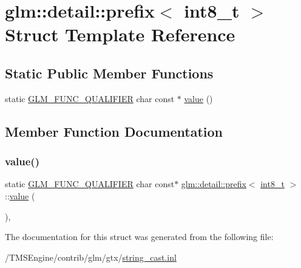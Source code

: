 \hypertarget{structglm_1_1detail_1_1prefix_3_01int8__t_01_4}{}\section{glm\+:\+:detail\+:\+:prefix$<$ int8\+\_\+t $>$ Struct Template Reference}
\label{structglm_1_1detail_1_1prefix_3_01int8__t_01_4}
\subsection*{Static Public Member Functions}
\begin{DoxyCompactItemize}
\item 
static \hyperlink{setup_8hpp_a33fdea6f91c5f834105f7415e2a64407}{G\+L\+M\+\_\+\+F\+U\+N\+C\+\_\+\+Q\+U\+A\+L\+I\+F\+I\+ER} char const  $\ast$ \hyperlink{structglm_1_1detail_1_1prefix_3_01int8__t_01_4_afb4b2223c44e4e8f75bde375b0f874a2}{value} ()
\end{DoxyCompactItemize}


\subsection{Member Function Documentation}
\mbox{\label{structglm_1_1detail_1_1prefix_3_01int8__t_01_4_afb4b2223c44e4e8f75bde375b0f874a2}} 
\subsubsection{\texorpdfstring{value()}{value()}}
{\footnotesize\ttfamily static \hyperlink{setup_8hpp_a33fdea6f91c5f834105f7415e2a64407}{G\+L\+M\+\_\+\+F\+U\+N\+C\+\_\+\+Q\+U\+A\+L\+I\+F\+I\+ER} char const$\ast$ \hyperlink{structglm_1_1detail_1_1prefix}{glm\+::detail\+::prefix}$<$ \hyperlink{group__gtc__type__precision_ga673898d450b2a91186f3c4f40c5f8633}{int8\+\_\+t} $>$\+::\hyperlink{_s_d_l__opengl__glext_8h_a8ad81492d410ff2ac11f754f4042150f}{value} (\begin{DoxyParamCaption}{ }\end{DoxyParamCaption})\hspace{0.3cm}{\ttfamily [inline]}, {\ttfamily [static]}}



The documentation for this struct was generated from the following file\+:\begin{DoxyCompactItemize}
\item 
/\+T\+M\+S\+Engine/contrib/glm/gtx/\hyperlink{string__cast_8inl}{string\+\_\+cast.\+inl}\end{DoxyCompactItemize}
